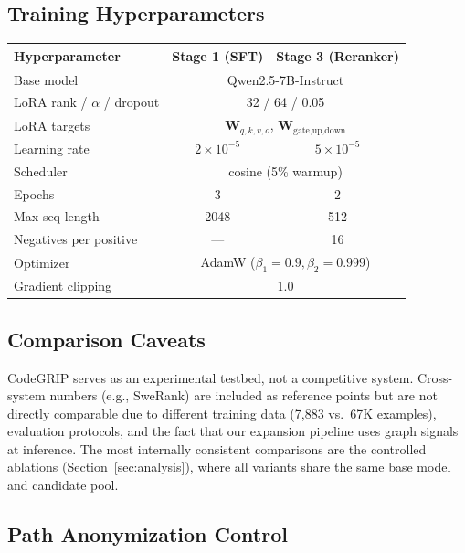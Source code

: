 \documentclass{article}
\begin{document}
\subsection{Training Hyperparameters}
\label{app:hyperparams}

\begin{table}[h]
\centering
\small
\begin{tabular}{lcc}
\toprule
\textbf{Hyperparameter} & \textbf{Stage 1 (SFT)} & \textbf{Stage 3 (Reranker)} \\
\midrule
Base model & \multicolumn{2}{c}{Qwen2.5-7B-Instruct} \\
LoRA rank / $\alpha$ / dropout & \multicolumn{2}{c}{32 / 64 / 0.05} \\
LoRA targets & \multicolumn{2}{c}{$\mathbf{W}_{q,k,v,o}$, $\mathbf{W}_{\text{gate,up,down}}$} \\
Learning rate & $2 \times 10^{-5}$ & $5 \times 10^{-5}$ \\
Scheduler & \multicolumn{2}{c}{cosine (5\% warmup)} \\
Epochs & 3 & 2 \\
Max seq length & 2048 & 512 \\
Negatives per positive & --- & 16 \\
Optimizer & \multicolumn{2}{c}{AdamW ($\beta_1=0.9, \beta_2=0.999$)} \\
Gradient clipping & \multicolumn{2}{c}{1.0} \\
\bottomrule
\end{tabular}
\end{table}


\subsection{Comparison Caveats}
\label{app:caveats}

CodeGRIP serves as an experimental testbed, not a competitive system. Cross-system numbers (e.g., SweRank) are included as reference points but are not directly comparable due to different training data (7,883 vs.\ 67K examples), evaluation protocols, and the fact that our expansion pipeline uses graph signals at inference. The most internally consistent comparisons are the controlled ablations (Section~\ref{sec:analysis}), where all variants share the same base model and candidate pool.


\subsection{Path Anonymization Control}
\label{app:path_anon}
\end{document}
